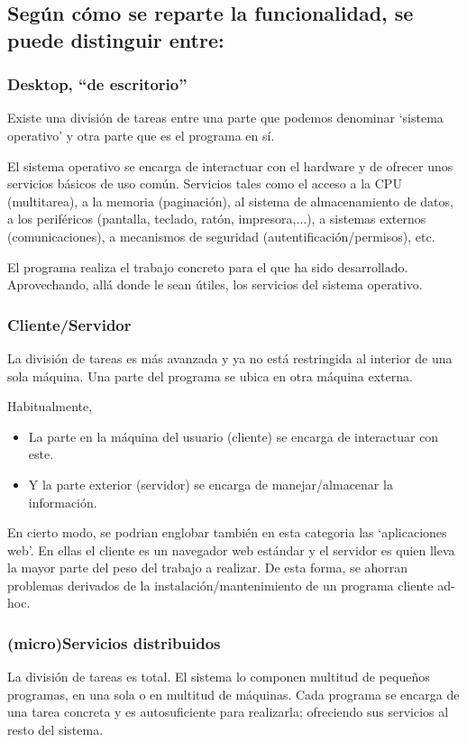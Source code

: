 \documentclass[spanish,12pt,a4paper,final,oneside]{book}
\begin{document}
\subsection{Según cómo se reparte la funcionalidad, se puede distinguir entre:}

\subsubsection{Desktop, ``de escritorio''}
Existe una división de tareas entre una parte que podemos denominar `sistema operativo' y otra parte que es el programa en sí.

El sistema operativo se encarga de interactuar con el hardware y de ofrecer unos servicios básicos de uso común. Servicios tales como el acceso a la CPU (multitarea), a la memoria (paginación), al sistema de almacenamiento de datos, a los periféricos (pantalla, teclado, ratón, impresora,...), a sistemas externos (comunicaciones), a mecanismos de seguridad (autentificación/permisos), etc.

El programa realiza el trabajo concreto para el que ha sido desarrollado. Aprovechando, allá donde le sean útiles, los servicios del sistema operativo.

\subsubsection{Cliente/Servidor}
La división de tareas es más avanzada y ya no está restringida al interior de una sola máquina. Una parte del programa se ubica en otra máquina externa.

Habitualmente, 
\begin{itemize}
\item La parte en la máquina del usuario (cliente) se encarga de interactuar con este. 
\item Y la parte exterior (servidor) se encarga de manejar/almacenar la información.
\end{itemize}

En cierto modo, se podrian englobar también en esta categoria las `aplicaciones web'. En ellas el cliente es un navegador web estándar y el servidor es quien lleva la mayor parte del peso del trabajo a realizar. De esta forma, se ahorran problemas derivados de la instalación/mantenimiento de un programa cliente ad-hoc.

\subsubsection{(micro)Servicios distribuidos}
La división de tareas es total. El sistema lo componen multitud de pequeños programas, en una sola o en multitud de máquinas. Cada programa se encarga de una tarea concreta y es autosuficiente para realizarla; ofreciendo sus servicios al resto del sistema.
\end{document}
